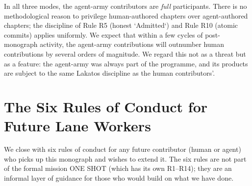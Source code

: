 In all three modes, the agent-army contributors are \emph{full} participants. There is no methodological reason to privilege human-authored chapters over agent-authored chapters; the discipline of Rule R5 (honest `Admitted`) and Rule R10 (atomic commits) applies uniformly. We expect that within a few cycles of post-monograph activity, the agent-army contributions will outnumber human contributions by several orders of magnitude. We regard this not as a threat but as a feature: the agent-army was always part of the programme, and its products are subject to the same Lakatos discipline as the human contributors'.

\section{The Six Rules of Conduct for Future Lane Workers}
\label{sec:31-six-rules}

We close with six rules of conduct for any future contributor (human or agent) who picks up this monograph and wishes to extend it. The six rules are not part of the formal mission ONE SHOT (which has its own R1–R14); they are an informal layer of guidance for those who would build on what we have done.

